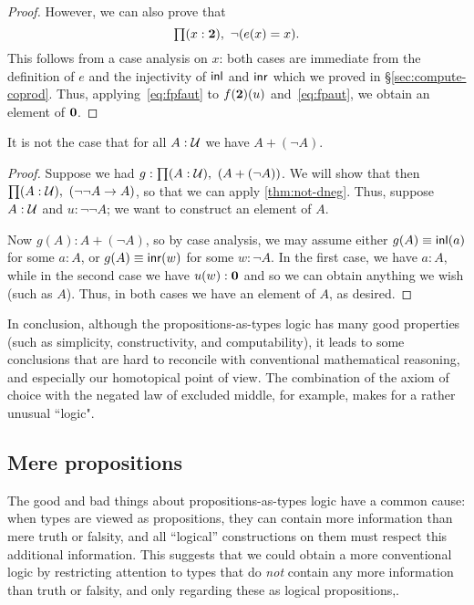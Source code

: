 \begin{proof}
  However, we can also prove that
  \begin{equation}
    \prd{x:\bool} \neg(e(x)=x).\label{eq:fpfaut}
  \end{equation}
  This follows from a case analysis on $x$: both cases are immediate from the definition of $e$ and the injectivity of $\mathsf{inl}$ and $\mathsf{inr}$ which we proved in \S\ref{sec:compute-coprod}.
  Thus, applying~\eqref{eq:fpfaut} to $f(\mathbf{2})(u)$ and~\eqref{eq:fpaut}, we obtain an element of $\mathbf{0}$.
\end{proof}

\begin{cor}\label{thm:not-lem}
  It is not the case that for all $A:\mathcal{U}$ we have $A+(\neg A)$.
\end{cor}
\begin{proof}
  Suppose we had $g:\prd{A:\UU} (A+(\neg A))$.
  We will show that then $\prd{A:\UU} (\neg\neg A \to A)$, so that we can apply \autoref{thm:not-dneg}.
  Thus, suppose $A:\mathcal{U}$ and $u:\neg\neg A$; we want to construct an element of $A$.

  Now $g(A):A+(\neg A)$, so by case analysis, we may assume either $g(A)\equiv \mathsf{inl}(a)$ for some $a:A$, or $g(A)\equiv \mathsf{inr}(w)$ for some $w:\neg A$.
  In the first case, we have $a:A$, while in the second case we have $u(w):\mathbf{0}$ and so we can obtain anything we wish (such as $A$).
  Thus, in both cases we have an element of $A$, as desired.
\end{proof}

In conclusion, although the propositions-as-types logic has many good properties (such as simplicity, constructivity, and computability), it leads to some conclusions that are hard to reconcile with conventional mathematical reasoning, and especially our homotopical point of view.  The combination of the axiom of choice with the negated law of excluded middle, for example, makes for a rather unusual ``logic".

\subsection{Mere propositions}
\label{subsec:hprops}

The good and bad things about propositions-as-types logic have a common cause: when types are viewed as propositions, they can contain more information than mere truth or falsity, and all ``logical'' constructions on them must respect this additional information.
This suggests that we could obtain a more conventional logic by restricting attention to types that do \emph{not} contain any more information than truth or falsity, and only regarding these as logical propositions,.

